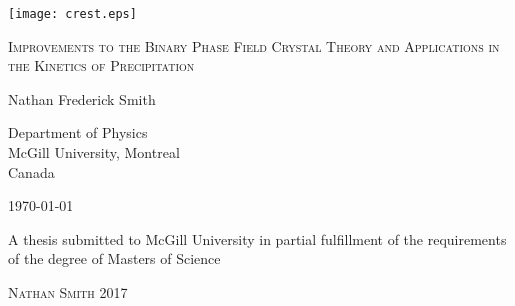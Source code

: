 
\begin{titlepage}
    \begin{center}
        
        \texttt{[image: crest.eps]}\par
       
        \vspace{1cm}

        {\Large \textsc{ 
            Improvements to the Binary Phase Field Crystal Theory
            and Applications in the Kinetics of Precipitation
        }\par}
       
        \vfill

        {\Large 
            Nathan Frederick Smith\par
        }
      
        \vspace{5mm}

        {\large 
            Department of Physics \\
            McGill University, Montreal \\
            Canada
        }

        \vspace{5mm} 

        {\large \today\par}
        
        \vspace{1cm}

        {\large
            A thesis submitted to McGill University in partial fulfillment 
            of the requirements of the degree of Masters of Science\par
        }
       
        \vspace{1cm}

        {\textcopyright \hspace{1mm} \textsc{Nathan Smith 2017}\par}
   
    \end{center}
\end{titlepage}

